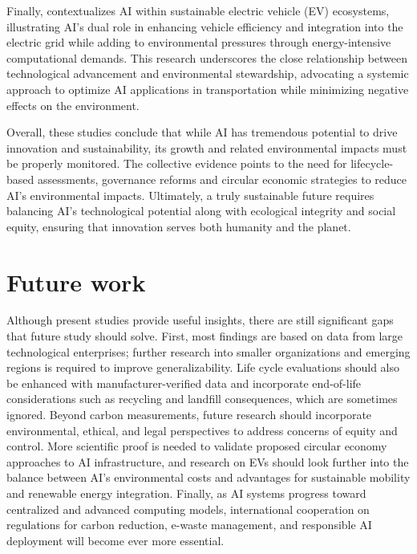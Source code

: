 \documentclass[a4paper, 12pt]{article}
\begin{document}
\par Finally, \citet{M.rauf2024} contextualizes AI within sustainable electric vehicle (EV) ecosystems, illustrating AI’s dual role in enhancing vehicle efficiency and integration into the electric grid while adding to environmental pressures through energy-intensive computational demands. This research underscores the close relationship between technological advancement and environmental stewardship, advocating a systemic approach to optimize AI applications in transportation while minimizing negative effects on the environment.  
\hfill \break
\par Overall, these studies conclude that while AI has tremendous potential to drive innovation and sustainability, its growth and related environmental impacts must be properly monitored. The collective evidence points to the need for lifecycle-based assessments, governance reforms and circular economic strategies to reduce AI's environmental impacts. Ultimately, a truly sustainable future requires balancing AI's technological potential along with ecological integrity and social equity, ensuring that innovation serves both humanity and the planet.

\section{Future work}
\par Although present studies provide useful insights, there are still significant gaps that future study should solve. First, most findings are based on data from large technological enterprises; further research into smaller organizations and emerging regions is required to improve generalizability.  Life cycle evaluations should also be enhanced with manufacturer-verified data and incorporate end-of-life considerations such as recycling and landfill consequences, which are sometimes ignored. Beyond carbon measurements, future research should incorporate environmental, ethical, and legal perspectives to address concerns of equity and control.  More scientific proof is needed to validate proposed circular economy approaches to AI infrastructure, and research on EVs should look further into the balance between AI's environmental costs and advantages for sustainable mobility and renewable energy integration.  Finally, as AI systems progress toward centralized and advanced computing models, international cooperation on regulations for carbon reduction, e-waste management, and responsible AI deployment will become ever more essential.%
\printbibliography
\end{document}
